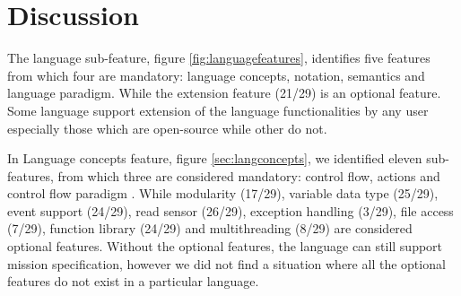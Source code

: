 \section{Discussion}


The language sub-feature, figure  \ref{fig:languagefeatures}, identifies five features from which four are mandatory: language concepts, notation, semantics and language paradigm. While the extension feature (21/29) is an optional feature. Some language support extension of the language functionalities by any user especially those which are open-source  while other do not.

In Language concepts feature, figure \ref{sec:langconcepts}, we identified eleven sub-features, from which three are considered mandatory: control flow, actions and control flow paradigm . While modularity (17/29), variable data type (25/29), event support (24/29), read sensor (26/29), exception handling (3/29), file access (7/29), function library (24/29) and multithreading (8/29) are considered optional features. Without the optional features, the language can still support mission specification, however we did not find a situation where all the optional features do not exist in a particular language.

